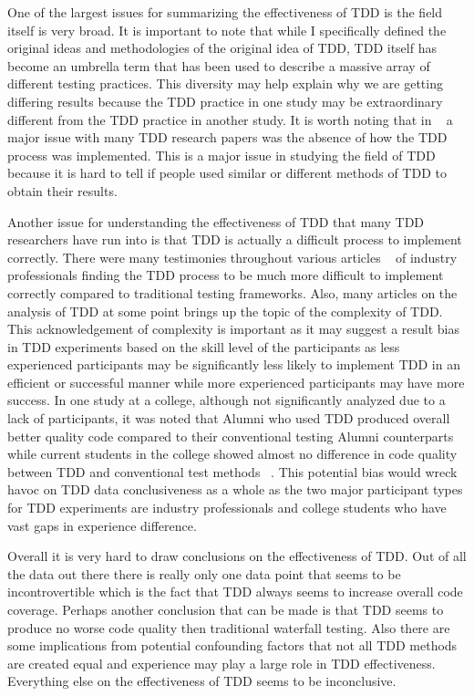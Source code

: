 \documentclass{sig-alternate}
\begin{document}
One of the largest issues for summarizing the effectiveness of TDD is the field itself is very broad.  It is important to note that while I specifically defined the original ideas and methodologies of the original idea of TDD, TDD itself has become an umbrella term that has been used to describe a massive array of different testing practices.  This diversity may help explain why we are getting differing results because the TDD practice in one study may be extraordinary different from the TDD practice in another study.  It is worth noting that in ~\cite{Hammond:2012} a major issue with many TDD research papers was the absence of how the TDD process was implemented. This is a major issue in studying the field of TDD because it is hard to tell if people used similar or different methods of TDD to obtain their results.

Another issue for understanding the effectiveness of TDD that many TDD researchers have run into is that TDD is actually a difficult process to implement correctly.  There were many testimonies throughout various articles ~\cite{Hammond:2012, Hellman:2012, Kettunen:2010} of industry professionals finding the TDD process to be much more difficult to implement correctly compared to traditional testing frameworks.  Also, many articles on the analysis of TDD at some point brings up the topic of the complexity of TDD. This acknowledgement of complexity is important as it may suggest a result bias in TDD experiments based on the skill level of the participants as less experienced participants may be significantly less likely to implement TDD in an efficient or successful manner while more experienced participants may have more success.  In one study at a college, although not significantly analyzed due to a lack of participants, it was noted that Alumni who used TDD produced overall better quality code compared to their conventional testing Alumni counterparts while current students in the college showed almost no difference in code quality between TDD and conventional test methods ~\cite{Lemos:2012}.  This potential bias would wreck havoc on TDD data conclusiveness as a whole as the two major participant types for TDD experiments are industry professionals and college students who have vast gaps in experience difference.

Overall it is very hard to draw conclusions on the effectiveness of TDD. Out of all the data out there there is really only one data point that seems to be incontrovertible which is the fact that TDD always seems to increase overall code coverage.  Perhaps another conclusion that can be made is that TDD seems to produce no worse code quality then traditional waterfall testing.  Also there are some implications from potential confounding factors that not all TDD methods are created equal and experience may play a large role in TDD effectiveness. Everything else on the effectiveness of TDD seems to be inconclusive.
\end{document}
